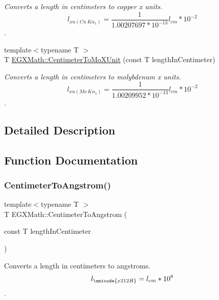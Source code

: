 \begin{DoxyCompactItemize}
\begin{DoxyCompactList}\small\item\em Converts a length in centimeters to copper x units. \[ l_{xu(Cu\ K\alpha_1)}= \frac{1}{1.00207697*10^{-13}} l_{cm} * 10^{-2}\]. \end{DoxyCompactList}\item 
{\footnotesize template$<$typename T $>$ }\\T \mbox{\hyperlink{group___e_g_x_math-_conversions-_length_conversions-_centimeter-_non-_s_i_ga4e94aa6f1cc6aaeb751384a8472b01fd}{E\+G\+X\+Math\+::\+Centimeter\+To\+Mo\+X\+Unit}} (const T length\+In\+Centimeter)
\begin{DoxyCompactList}\small\item\em Converts a length in centimeters to molybdenum x units. \[ l_{xu(Mo\ K\alpha_1)}=\frac{1}{1.00209952*10^{-13}} l_{cm} * 10^{-2}\]. \end{DoxyCompactList}\end{DoxyCompactItemize}


\subsection{Detailed Description}


\subsection{Function Documentation}
\mbox{\label{group___e_g_x_math-_conversions-_length_conversions-_centimeter-_non-_s_i_gacabf2b01cd8676ffb5ec8c70ecd621b6}} 
\subsubsection{\texorpdfstring{Centimeter\+To\+Angstrom()}{CentimeterToAngstrom()}}
{\footnotesize\ttfamily template$<$typename T $>$ \\
T E\+G\+X\+Math\+::\+Centimeter\+To\+Angstrom (\begin{DoxyParamCaption}\item[{const T}]{length\+In\+Centimeter }\end{DoxyParamCaption})}



Converts a length in centimeters to angstroms. \[ l_{\unicode{x212B}}=l_{cm} * 10^{8} \]. 

